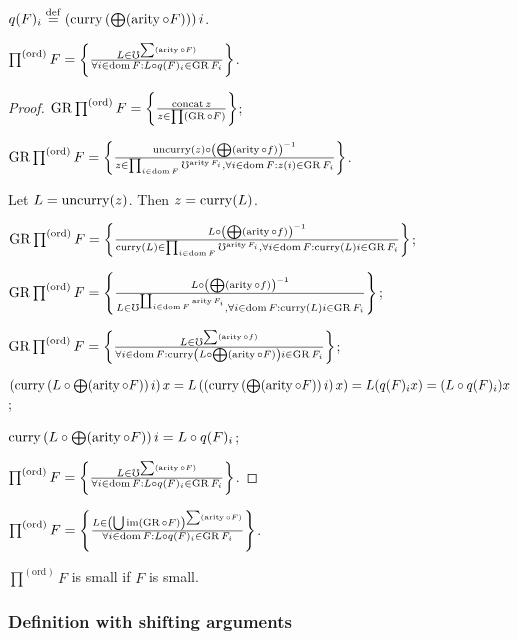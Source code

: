 $q(F)_{i}\overset{\mathrm{def}}{=}\left(\operatorname{curry}\left(\bigoplus(\operatorname{arity}\circ F)\right)\right)i$.
\begin{prop}
$\prod^{\mathrm{(ord)}}F=\left\{ \frac{L\in\mho^{\sum(\operatorname{arity}\circ F)}}{\forall i\in\operatorname{dom} F:L\circ q(F)_{i}\in\operatorname{GR} F_{i}}\right\}$.\end{prop}
\begin{proof}
$\operatorname{GR}\prod^{\mathrm{(ord)}}F=\left\{ \frac{\operatorname{concat} z}{z\in\prod(\operatorname{GR}\circ F)}\right\}$;

$\operatorname{GR}\prod^{\mathrm{(ord)}}F=\left\{ \frac{\operatorname{uncurry}(z)\circ\left(\bigoplus(\operatorname{arity}\circ f)\right)^{-1}}{z\in\prod_{i\in\operatorname{dom} F}\mho^{\operatorname{arity} F_{i}},\forall i\in\operatorname{dom} F:z(i)\in\operatorname{GR} F_{i}}\right\}$.

Let $L=\operatorname{uncurry}(z)$. Then $z=\operatorname{curry}(L)$.

$\operatorname{GR}\prod^{\mathrm{(ord)}}F=\left\{ \frac{L\circ\left(\bigoplus(\operatorname{arity}\circ f)\right)^{-1}}{\operatorname{curry}(L)\in\prod_{i\in\operatorname{dom} F}\mho^{\operatorname{arity} F_{i}},\forall i\in\operatorname{dom} F:\operatorname{curry}(L)i\in\operatorname{GR} F_{i}}\right\}$;

$\operatorname{GR}\prod^{\mathrm{(ord)}}F=\left\{ \frac{L\circ\left(\bigoplus(\operatorname{arity}\circ f)\right)^{-1}}{L\in\mho^{\coprod_{i\in\operatorname{dom} F}\operatorname{arity} F_{i}},\forall i\in\operatorname{dom} F:\operatorname{curry}(L)i\in\operatorname{GR} F_{i}}\right\}$;

$\operatorname{GR}\prod^{\mathrm{(ord)}}F=\left\{ \frac{L\in\mho^{\sum(\operatorname{arity}\circ f)}}{\forall i\in\operatorname{dom} F:\operatorname{curry}\left(L\circ\bigoplus(\operatorname{arity}\circ F)\right)i\in\operatorname{GR} F_{i}}\right\}$;

$\left(\operatorname{curry}\left(L\circ\bigoplus(\operatorname{arity}\circ F)\right)i\right)x=L\left(\left(\operatorname{curry}\left(\bigoplus(\operatorname{arity}\circ F)\right)i\right)x\right)=L(q(F)_{i}x)=(L\circ q(F)_{i})x$;

$\operatorname{curry}\left(L\circ\bigoplus(\operatorname{arity}\circ F)\right)i=L\circ q(F)_{i}$;

$\prod^{\mathrm{(ord)}}F=\left\{ \frac{L\in\mho^{\sum(\operatorname{arity}\circ F)}}{\forall i\in\operatorname{dom} F:L\circ q(F)_{i}\in\operatorname{GR} F_{i}}\right\}$.\end{proof}
\begin{cor}
$\prod^{\mathrm{(ord)}}F=\left\{ \frac{L\in\left(\bigcup\operatorname{im}(\operatorname{GR}\circ F)\right)^{\sum(\operatorname{arity}\circ F)}}{\forall i\in\operatorname{dom} F:L\circ q(F)_{i}\in\operatorname{GR} F_{i}}\right\}$.
\end{cor}

\begin{cor}
$\prod^{\mathrm{(ord)}}F$ is small if $F$ is small.
\end{cor}

\subsubsection{Definition with shifting arguments}

